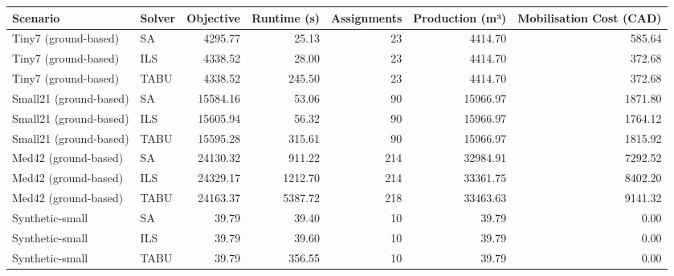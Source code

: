 \begin{tabular}{llrrrrr}
\toprule
Scenario & Solver & Objective & Runtime (s) & Assignments & Production (m³) & Mobilisation Cost (CAD) \\
\midrule
Tiny7 (ground-based) & SA & 4295.77 & 25.13 & 23 & 4414.70 & 585.64 \\
Tiny7 (ground-based) & ILS & 4338.52 & 28.00 & 23 & 4414.70 & 372.68 \\
Tiny7 (ground-based) & TABU & 4338.52 & 245.50 & 23 & 4414.70 & 372.68 \\
Small21 (ground-based) & SA & 15584.16 & 53.06 & 90 & 15966.97 & 1871.80 \\
Small21 (ground-based) & ILS & 15605.94 & 56.32 & 90 & 15966.97 & 1764.12 \\
Small21 (ground-based) & TABU & 15595.28 & 315.61 & 90 & 15966.97 & 1815.92 \\
Med42 (ground-based) & SA & 24130.32 & 911.22 & 214 & 32984.91 & 7292.52 \\
Med42 (ground-based) & ILS & 24329.17 & 1212.70 & 214 & 33361.75 & 8402.20 \\
Med42 (ground-based) & TABU & 24163.37 & 5387.72 & 218 & 33463.63 & 9141.32 \\
Synthetic-small & SA & 39.79 & 39.40 & 10 & 39.79 & 0.00 \\
Synthetic-small & ILS & 39.79 & 39.60 & 10 & 39.79 & 0.00 \\
Synthetic-small & TABU & 39.79 & 356.55 & 10 & 39.79 & 0.00 \\
\bottomrule
\end{tabular}
